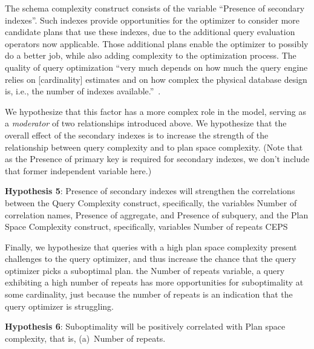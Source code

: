 \documentclass[prodmode,acmtods]{acmsmall}
\begin{document}
\vspace{0.6em}
The schema complexity construct consists of the variable ``Presence of
secondary indexes''. Such indexes provide opportunities for the optimizer to
consider more candidate plans that use these indexes, due to the additional
query evaluation operators now applicable. Those additional plans enable the optimizer to
possibly do a better job, while also adding complexity to the optimization
process.  The quality of query optimization ``very much depends on how much
the query engine relies on [cardinality] estimates and on how complex the
physical database design is, i.e., the number of indexes
available.''~\cite{Leis15}.

We hypothesize that this factor has a more complex role in the
model, serving as a {\em moderator} of two relationships introduced
above. We hypothesize that the overall effect of the secondary indexes 
is to increase the strength of the relationship between query
complexity and to plan space complexity. (Note that as the Presence of primary
key is required for secondary indexes, we don't include that former
independent variable here.)

\vspace{0.6em}\noindent
{\bf Hypothesis 5}: Presence of secondary indexes will strengthen
the correlations between the Query Complexity construct, specifically, the
variables Number of
correlation names, Presence of aggregate, and Presence of subquery, and
the Plan Space Complexity construct, specifically, variables Number of
repeats CEPS

\vspace{0.6em}
Finally, we hypothesize that queries with a high plan space complexity
present challenges to the query optimizer, and thus increase the chance that
the query optimizer picks a suboptimal plan.  the
Number of repeats variable, a query exhibiting a high number of repeats has
more opportunities for suboptimality at some cardinality, just because the
number of repeats is an indication that the query optimizer is struggling.

\vspace{0.6em}\noindent
{\bf Hypothesis 6}: Suboptimality will be positively correlated with Plan
space complexity, that is, (a)~Number of repeats.
\end{document}
